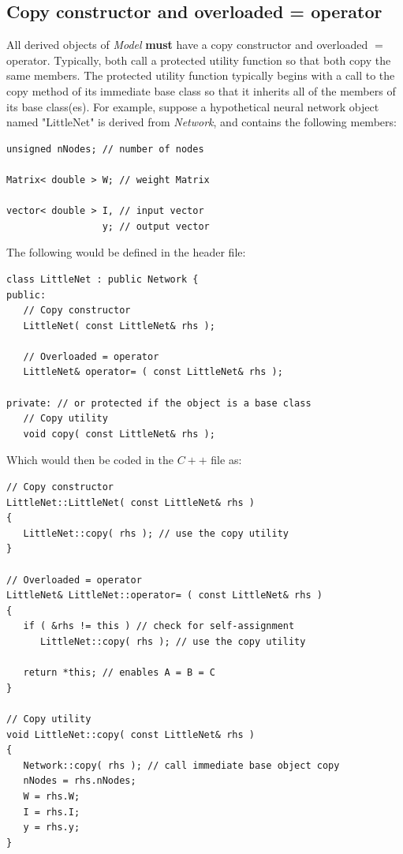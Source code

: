 \documentclass{report}
\begin{document}
\subsection{Copy constructor and overloaded = operator}\label{copy_fx}

All derived objects of {\em Model} {\bf must} have a copy constructor
and overloaded $=$ operator.  Typically, both call a protected utility
function so that both copy the same members.  The protected utility
function typically begins with a call to the copy method of its
immediate base class so that it inherits all of the members of its
base class(es).  For example, suppose a hypothetical neural network
object named "LittleNet" is derived from {\em Network}, and contains
the following members:

\begin{verbatim}
unsigned nNodes; // number of nodes

Matrix< double > W; // weight Matrix

vector< double > I, // input vector
                 y; // output vector
\end{verbatim}

The following would be defined in the header file:

\begin{verbatim}
class LittleNet : public Network {
public:
   // Copy constructor
   LittleNet( const LittleNet& rhs );

   // Overloaded = operator
   LittleNet& operator= ( const LittleNet& rhs );

private: // or protected if the object is a base class
   // Copy utility
   void copy( const LittleNet& rhs );
\end{verbatim}

Which would then be coded in the $C++$ file as:

\begin{verbatim}
// Copy constructor
LittleNet::LittleNet( const LittleNet& rhs )
{
   LittleNet::copy( rhs ); // use the copy utility
}

// Overloaded = operator
LittleNet& LittleNet::operator= ( const LittleNet& rhs )
{
   if ( &rhs != this ) // check for self-assignment
      LittleNet::copy( rhs ); // use the copy utility

   return *this; // enables A = B = C
}

// Copy utility
void LittleNet::copy( const LittleNet& rhs )
{
   Network::copy( rhs ); // call immediate base object copy
   nNodes = rhs.nNodes;
   W = rhs.W;
   I = rhs.I;
   y = rhs.y;
}
\end{verbatim}
\end{document}
